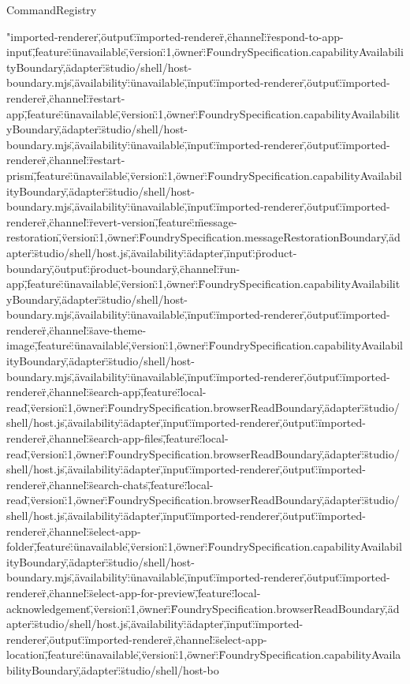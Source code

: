\begin{lexlean}{CommandRegistry}
\begin{semanticmodule}
{"imported-renderer\",\"output\":\"imported-renderer\"},{\"channel\":\"respond-to-app-input\",\"feature\":\"unavailable\",\"version\":1,\"owner\":\"FoundrySpecification.capabilityAvailabilityBoundary\",\"adapter\":\"studio/shell/host-boundary.mjs\",\"availability\":\"unavailable\",\"input\":\"imported-renderer\",\"output\":\"imported-renderer\"},{\"channel\":\"restart-app\",\"feature\":\"unavailable\",\"version\":1,\"owner\":\"FoundrySpecification.capabilityAvailabilityBoundary\",\"adapter\":\"studio/shell/host-boundary.mjs\",\"availability\":\"unavailable\",\"input\":\"imported-renderer\",\"output\":\"imported-renderer\"},{\"channel\":\"restart-prism\",\"feature\":\"unavailable\",\"version\":1,\"owner\":\"FoundrySpecification.capabilityAvailabilityBoundary\",\"adapter\":\"studio/shell/host-boundary.mjs\",\"availability\":\"unavailable\",\"input\":\"imported-renderer\",\"output\":\"imported-renderer\"},{\"channel\":\"revert-version\",\"feature\":\"message-restoration\",\"version\":1,\"owner\":\"FoundrySpecification.messageRestorationBoundary\",\"adapter\":\"studio/shell/host.js\",\"availability\":\"adapter\",\"input\":\"product-boundary\",\"output\":\"product-boundary\"},{\"channel\":\"run-app\",\"feature\":\"unavailable\",\"version\":1,\"owner\":\"FoundrySpecification.capabilityAvailabilityBoundary\",\"adapter\":\"studio/shell/host-boundary.mjs\",\"availability\":\"unavailable\",\"input\":\"imported-renderer\",\"output\":\"imported-renderer\"},{\"channel\":\"save-theme-image\",\"feature\":\"unavailable\",\"version\":1,\"owner\":\"FoundrySpecification.capabilityAvailabilityBoundary\",\"adapter\":\"studio/shell/host-boundary.mjs\",\"availability\":\"unavailable\",\"input\":\"imported-renderer\",\"output\":\"imported-renderer\"},{\"channel\":\"search-app\",\"feature\":\"local-read\",\"version\":1,\"owner\":\"FoundrySpecification.browserReadBoundary\",\"adapter\":\"studio/shell/host.js\",\"availability\":\"adapter\",\"input\":\"imported-renderer\",\"output\":\"imported-renderer\"},{\"channel\":\"search-app-files\",\"feature\":\"local-read\",\"version\":1,\"owner\":\"FoundrySpecification.browserReadBoundary\",\"adapter\":\"studio/shell/host.js\",\"availability\":\"adapter\",\"input\":\"imported-renderer\",\"output\":\"imported-renderer\"},{\"channel\":\"search-chats\",\"feature\":\"local-read\",\"version\":1,\"owner\":\"FoundrySpecification.browserReadBoundary\",\"adapter\":\"studio/shell/host.js\",\"availability\":\"adapter\",\"input\":\"imported-renderer\",\"output\":\"imported-renderer\"},{\"channel\":\"select-app-folder\",\"feature\":\"unavailable\",\"version\":1,\"owner\":\"FoundrySpecification.capabilityAvailabilityBoundary\",\"adapter\":\"studio/shell/host-boundary.mjs\",\"availability\":\"unavailable\",\"input\":\"imported-renderer\",\"output\":\"imported-renderer\"},{\"channel\":\"select-app-for-preview\",\"feature\":\"local-acknowledgement\",\"version\":1,\"owner\":\"FoundrySpecification.browserReadBoundary\",\"adapter\":\"studio/shell/host.js\",\"availability\":\"adapter\",\"input\":\"imported-renderer\",\"output\":\"imported-renderer\"},{\"channel\":\"select-app-location\",\"feature\":\"unavailable\",\"version\":1,\"owner\":\"FoundrySpecification.capabilityAvailabilityBoundary\",\"adapter\":\"studio/shell/host-bo}
\end{semanticmodule}
\end{lexlean}
